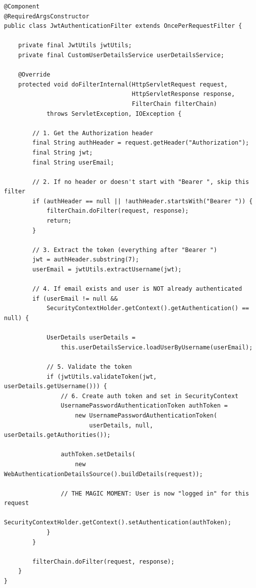 \documentclass[11pt, a4paper]{article}
\begin{document}
\begin{lstlisting}[caption={JwtAuthenticationFilter.java -- The Security Guard}]
@Component
@RequiredArgsConstructor
public class JwtAuthenticationFilter extends OncePerRequestFilter {

    private final JwtUtils jwtUtils;
    private final CustomUserDetailsService userDetailsService;

    @Override
    protected void doFilterInternal(HttpServletRequest request,
                                    HttpServletResponse response,
                                    FilterChain filterChain)
            throws ServletException, IOException {

        // 1. Get the Authorization header
        final String authHeader = request.getHeader("Authorization");
        final String jwt;
        final String userEmail;

        // 2. If no header or doesn't start with "Bearer ", skip this filter
        if (authHeader == null || !authHeader.startsWith("Bearer ")) {
            filterChain.doFilter(request, response);
            return;
        }

        // 3. Extract the token (everything after "Bearer ")
        jwt = authHeader.substring(7);
        userEmail = jwtUtils.extractUsername(jwt);

        // 4. If email exists and user is NOT already authenticated
        if (userEmail != null &&
            SecurityContextHolder.getContext().getAuthentication() == null) {

            UserDetails userDetails =
                this.userDetailsService.loadUserByUsername(userEmail);

            // 5. Validate the token
            if (jwtUtils.validateToken(jwt, userDetails.getUsername())) {
                // 6. Create auth token and set in SecurityContext
                UsernamePasswordAuthenticationToken authToken =
                    new UsernamePasswordAuthenticationToken(
                        userDetails, null, userDetails.getAuthorities());

                authToken.setDetails(
                    new WebAuthenticationDetailsSource().buildDetails(request));

                // THE MAGIC MOMENT: User is now "logged in" for this request
                SecurityContextHolder.getContext().setAuthentication(authToken);
            }
        }

        filterChain.doFilter(request, response);
    }
}
\end{lstlisting}
\end{document}
